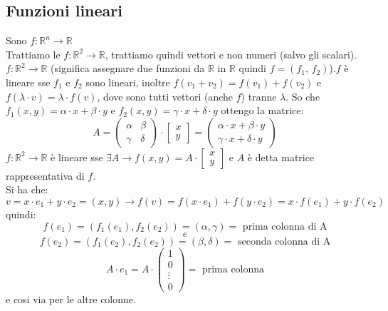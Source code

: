 \documentclass[a4paper,12pt, oneside]{book}
\begin{document}
\subsection{Funzioni lineari}
Sono $f:\mathbb{R}^n\rightarrow \mathbb{R}$ \\
Trattiamo le $f:\mathbb{R}^2\rightarrow \mathbb{R}$, trattiamo quindi vettori e non numeri (salvo gli scalari). $f:\mathbb{R}^2\rightarrow \mathbb{R}$ (significa assegnare due funzioni da $\mathbb{R}$ in $\mathbb{R}$ quindi $f=(f_1,\,f_2)$).$f$ è lineare sse $f_1$ e $f_2$ sono lineari, inoltre $f(v_1+v_2)=f(v_1)+f(v_2)$ e $ f(\lambda\cdot v)=\lambda\cdot f(v)$, dove sono tutti vettori (anche $f$) tranne $\lambda$. So che $f_1(x,y)=\alpha\cdot x +\beta\cdot y$ e $f_2(x,y)=\gamma\cdot x +\delta\cdot y$ ottengo la matrice:
$$
	A=\left(\begin{matrix}
			\alpha & \beta  \\
			\gamma & \delta
		\end{matrix}\right)\cdot
	\left[\begin{matrix}
			x \\
			y
		\end{matrix}\right]=
	\left(\begin{matrix}
			\alpha\cdot x +\beta\cdot y \\
			\gamma\cdot x +\delta\cdot y
		\end{matrix}\right)
$$
$f:\mathbb{R}^2\rightarrow \mathbb{R}$ è lineare sse $\exists A\rightarrow f(x,y)=A\cdot
	\left[\begin{matrix}
			x \\
			y
		\end{matrix}\right]$ e $A$ è detta matrice rappresentativa di $f$.\\

Si ha che:$$v=x\cdot e_1+y\cdot e_2=(x,y)\rightarrow f(v)=f(x\cdot e_1)+ f(y\cdot e_2) = x\cdot f(e_1)+y\cdot f(e_2)$$
quindi:
$$f(e_1)=(f_1(e_1),f_2(e_2))=(\alpha,\gamma)=\mbox{ prima colonna di A}$$
$$e$$
$$f(e_2)=(f_1(e_2),f_2(e_2))=(\beta,\delta)=\mbox{ seconda colonna di A}$$
$$A\cdot e_1=A\cdot
	\left(\begin{matrix}
			1      \\
			0      \\
			\vdots \\
			0
		\end{matrix}\right)=\mbox{ prima colonna}
$$
e cosi via per le altre colonne.
\end{document}
